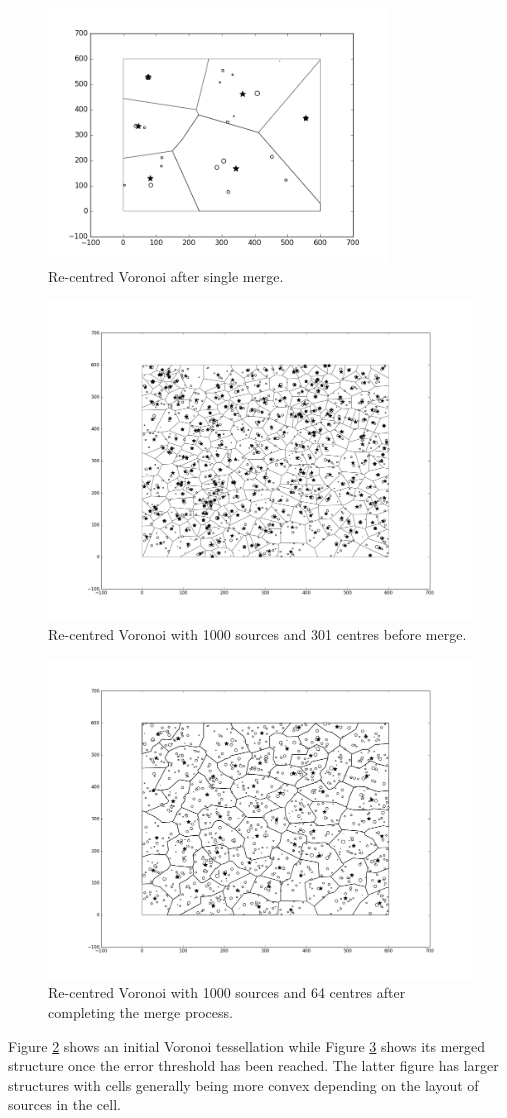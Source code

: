 \begin{figure}[H]
\centering
  \includegraphics[width=0.8\textwidth]{Images/1merge2.png}
  \caption{Re-centred Voronoi after single merge.}
  \label{fig:1merge2}
\end{figure}
\begin{figure}[H]
\centering
  \includegraphics[width=0.8\linewidth]{Images/merge1.png}
  \caption{Re-centred Voronoi with 1000 sources and 301 centres before merge.}
  \label{fig:merge1}
\end{figure}
\begin{figure}[H]
\centering
  \includegraphics[width=0.8\linewidth]{Images/merge2.png}
  \caption{Re-centred Voronoi with 1000 sources and 64 centres after completing the merge process.}
  \label{fig:merge2}
\end{figure}
Figure \ref{fig:merge1} shows an initial Voronoi tessellation while Figure \ref{fig:merge2} shows its merged structure once the error threshold has been reached. The latter figure has larger structures with cells generally being more convex depending on the layout of sources in the cell.
